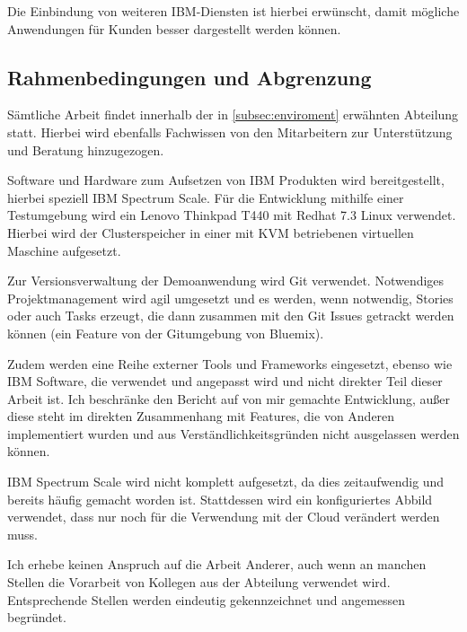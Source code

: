 Die Einbindung von weiteren IBM-Diensten ist hierbei erwünscht, damit mögliche Anwendungen für Kunden besser dargestellt werden können.

\subsection{Rahmenbedingungen und Abgrenzung}

Sämtliche Arbeit findet innerhalb der in \autoref{subsec:enviroment} erwähnten Abteilung statt. Hierbei wird ebenfalls Fachwissen von den Mitarbeitern zur Unterstützung und Beratung hinzugezogen.

Software und Hardware zum Aufsetzen von IBM Produkten wird bereitgestellt, hierbei speziell IBM Spectrum Scale. Für die Entwicklung mithilfe einer Testumgebung wird ein Lenovo Thinkpad T440 mit Redhat 7.3 Linux verwendet. Hierbei wird der Clusterspeicher in einer mit KVM betriebenen virtuellen Maschine aufgesetzt.

Zur Versionsverwaltung der Demoanwendung wird \gls{Git} verwendet. Notwendiges Projektmanagement wird agil umgesetzt und es werden, wenn notwendig, Stories oder auch Tasks erzeugt, die dann zusammen mit den Git Issues getrackt werden können (ein Feature von der Gitumgebung von Bluemix).

Zudem werden eine Reihe externer Tools und Frameworks eingesetzt, ebenso wie IBM Software, die verwendet und angepasst wird und nicht direkter Teil dieser Arbeit ist. Ich beschränke den Bericht auf von mir gemachte Entwicklung, außer diese steht im direkten Zusammenhang mit Features, die von Anderen implementiert wurden und aus Verständlichkeitsgründen nicht ausgelassen werden können.

IBM Spectrum Scale wird nicht komplett aufgesetzt, da dies zeitaufwendig und bereits häufig gemacht worden ist. Stattdessen wird ein konfiguriertes Abbild verwendet, dass nur noch für die Verwendung mit der Cloud verändert werden muss.

Ich erhebe keinen Anspruch auf die Arbeit Anderer, auch wenn an manchen Stellen die Vorarbeit von Kollegen aus der Abteilung verwendet wird. Entsprechende Stellen werden eindeutig gekennzeichnet und angemessen begründet.